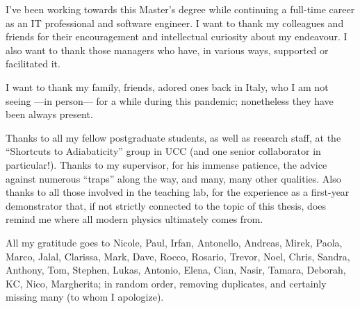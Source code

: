 {

  I've been working towards this Master's degree
  while continuing a full-time career
  as an IT professional and software engineer.
  I want to thank my
  colleagues and friends for their encouragement
  and intellectual curiosity
  about my endeavour.
  I also want to thank those managers
  who have, in various ways, supported or facilitated it.

  I want to thank my family, friends, adored ones back in Italy,
  who I am not seeing ---in person--- for a while during this pandemic;
  nonetheless they have been always present.
  
  Thanks to all my fellow postgraduate students,
  as well as research staff,
  at the ``Shortcuts to Adiabaticity'' group in UCC
  (and one senior collaborator in particular!).
  Thanks to my {supervisor}, for his immense patience,
  the advice against numerous ``traps'' along the way, and many, many other qualities.
  Also thanks to all those involved in the teaching lab, for the experience as a
  first-year demonstrator that,
  if not strictly connected to the topic of this thesis,
  does remind me where all modern physics ultimately comes from.

  All my gratitude goes to
  Nicole,
  Paul,
  Irfan,
  Antonello,
  Andreas,
  Mirek,
  Paola,
  Marco,
  Jalal,
  Clarissa,
  Mark,
  Dave,
  Rocco,
  Rosario,
  Trevor,
  Noel,
  Chris,
  Sandra,
  Anthony,
  Tom,
  Stephen,
  Lukas,
  Antonio,
  Elena,
  Cian,
  Nasir,
  Tamara,
  Deborah,
  KC,
  Nico,
  Margherita;
  in random order, removing duplicates, and certainly missing many (to whom I apologize).
}
